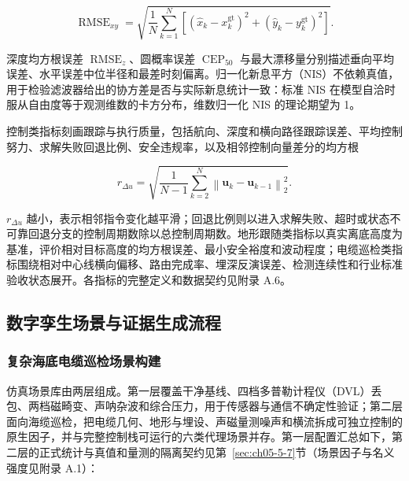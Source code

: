\begin{equation}
\operatorname{RMSE}_{xy}
=
\sqrt{\frac{1}{N}
\sum_{k=1}^{N}
\left[
(\hat{x}_k-x_k^{\mathrm{gt}})^2
+
(\hat{y}_k-y_k^{\mathrm{gt}})^2
\right]}.
\label{eq:ch05-rmse-xy}
\end{equation}

深度均方根误差 \(\operatorname{RMSE}_z\)、圆概率误差 \(\operatorname{CEP}_{50}\) 与最大漂移量分别描述垂向平均误差、水平误差中位半径和最差时刻偏离。归一化新息平方（NIS）不依赖真值，用于检验滤波器给出的协方差是否与实际新息统计一致：标准 NIS 在模型自洽时服从自由度等于观测维数的卡方分布\cite{barshalom2001estimation}，维数归一化 NIS 的理论期望为 1。

控制类指标刻画跟踪与执行质量，包括航向、深度和横向路径跟踪误差、平均控制努力、求解失败回退比例、安全违规率，以及相邻控制向量差分的均方根

\begin{equation}
r_{\Delta u}
=
\sqrt{
\frac{1}{N-1}
\sum_{k=2}^{N}
\left\|
\boldsymbol{u}_k-\boldsymbol{u}_{k-1}
\right\|_2^2
}.
\label{eq:ch05-control-smoothness}
\end{equation}

\(r_{\Delta u}\) 越小，表示相邻指令变化越平滑；回退比例则以进入求解失败、超时或状态不可靠回退分支的控制周期数除以总控制周期数。地形跟随类指标以真实离底高度为基准，评价相对目标高度的均方根误差、最小安全裕度和波动程度；电缆巡检类指标围绕相对中心线横向偏移、路由完成率、埋深反演误差、检测连续性和行业标准验收状态展开。各指标的完整定义和数据契约见附录 A.6。

\subsection{数字孪生场景与证据生成流程}\label{sec:ch05-5-2}

\subsubsection{复杂海底电缆巡检场景构建}\label{sec:ch05-5-2-1}

仿真场景库由两层组成。第一层覆盖干净基线、四档多普勒计程仪（DVL）丢包、两档磁畸变、声呐杂波和综合压力，用于传感器与通信不确定性验证；第二层面向海缆巡检，把电缆几何、地形与埋设、声磁量测噪声和横流拆成可独立控制的原生因子，并与完整控制栈可运行的六类代理场景并存。第一层配置汇总如下，第二层的正式统计与真值和量测的隔离契约见第~\ref{sec:ch05-5-7}节（场景因子与名义强度见附录 A.1）：


